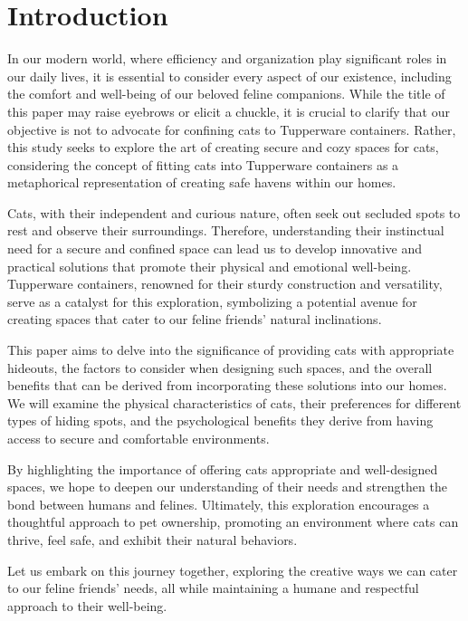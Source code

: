 \section{Introduction}
In our modern world, where efficiency and organization play significant roles in our daily lives, it is essential to consider every aspect of our existence, including the comfort and well-being of our beloved feline companions. While the title of this paper may raise eyebrows or elicit a chuckle, it is crucial to clarify that our objective is not to advocate for confining cats to Tupperware containers. Rather, this study seeks to explore the art of creating secure and cozy spaces for cats, considering the concept of fitting cats into Tupperware containers as a metaphorical representation of creating safe havens within our homes.

Cats, with their independent and curious nature, often seek out secluded spots to rest and observe their surroundings. Therefore, understanding their instinctual need for a secure and confined space can lead us to develop innovative and practical solutions that promote their physical and emotional well-being. Tupperware containers, renowned for their sturdy construction and versatility, serve as a catalyst for this exploration, symbolizing a potential avenue for creating spaces that cater to our feline friends' natural inclinations.

This paper aims to delve into the significance of providing cats with appropriate hideouts, the factors to consider when designing such spaces, and the overall benefits that can be derived from incorporating these solutions into our homes. We will examine the physical characteristics of cats, their preferences for different types of hiding spots, and the psychological benefits they derive from having access to secure and comfortable environments.

By highlighting the importance of offering cats appropriate and well-designed spaces, we hope to deepen our understanding of their needs and strengthen the bond between humans and felines. Ultimately, this exploration encourages a thoughtful approach to pet ownership, promoting an environment where cats can thrive, feel safe, and exhibit their natural behaviors.

Let us embark on this journey together, exploring the creative ways we can cater to our feline friends' needs, all while maintaining a humane and respectful approach to their well-being.
